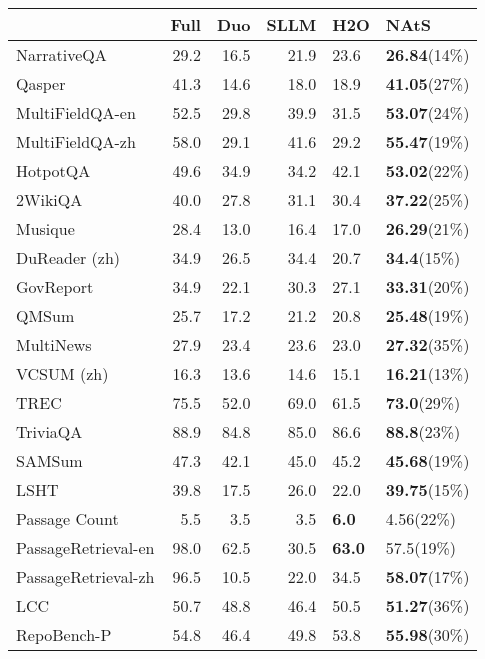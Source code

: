 \begin{tabular}{lrrrll}
\toprule
 & Full & Duo & SLLM & H2O & NAtS \\
\midrule
NarrativeQA & 29.2 & 16.5 & 21.9 & 23.6 & \textbf {26.84}(14\%) \\
Qasper & 41.3 & 14.6 & 18.0 & 18.9 & \textbf {41.05}(27\%) \\
MultiFieldQA-en & 52.5 & 29.8 & 39.9 & 31.5 & \textbf {53.07}(24\%) \\
MultiFieldQA-zh & 58.0 & 29.1 & 41.6 & 29.2 & \textbf {55.47}(19\%) \\
HotpotQA & 49.6 & 34.9 & 34.2 & 42.1 & \textbf {53.02}(22\%) \\
2WikiQA & 40.0 & 27.8 & 31.1 & 30.4 & \textbf {37.22}(25\%) \\
Musique & 28.4 & 13.0 & 16.4 & 17.0 & \textbf {26.29}(21\%) \\
DuReader (zh) & 34.9 & 26.5 & 34.4 & 20.7 & \textbf {34.4}(15\%) \\
GovReport & 34.9 & 22.1 & 30.3 & 27.1 & \textbf {33.31}(20\%) \\
QMSum & 25.7 & 17.2 & 21.2 & 20.8 & \textbf {25.48}(19\%) \\
MultiNews & 27.9 & 23.4 & 23.6 & 23.0 & \textbf {27.32}(35\%) \\
VCSUM (zh) & 16.3 & 13.6 & 14.6 & 15.1 & \textbf {16.21}(13\%) \\
TREC & 75.5 & 52.0 & 69.0 & 61.5 & \textbf {73.0}(29\%) \\
TriviaQA & 88.9 & 84.8 & 85.0 & 86.6 & \textbf {88.8}(23\%) \\
SAMSum & 47.3 & 42.1 & 45.0 & 45.2 & \textbf {45.68}(19\%) \\
LSHT & 39.8 & 17.5 & 26.0 & 22.0 & \textbf {39.75}(15\%) \\
Passage Count & 5.5 & 3.5 & 3.5 & \textbf {6.0} & 4.56(22\%) \\
PassageRetrieval-en & 98.0 & 62.5 & 30.5 & \textbf {63.0} & 57.5(19\%) \\
PassageRetrieval-zh & 96.5 & 10.5 & 22.0 & 34.5 & \textbf {58.07}(17\%) \\
LCC & 50.7 & 48.8 & 46.4 & 50.5 & \textbf {51.27}(36\%) \\
RepoBench-P & 54.8 & 46.4 & 49.8 & 53.8 & \textbf {55.98}(30\%) \\
\bottomrule
\end{tabular}